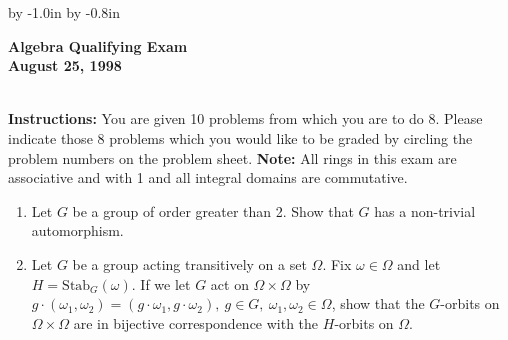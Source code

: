 \def\hcorrection#1{\advance\hoffset by #1 }
\def\vcorrection#1{\advance\voffset by #1 }

\pagestyle{plain}


\vcorrection{-1.0in}
\hcorrection{-0.8in}
\textwidth 6.0in
\textheight 9.0in

\begin{Large}


\def\Q{{\Bbb Q}}
\def\F{{\Bbb F}}
\def\K{{\Bbb K}}



\begin{center}\begin{LARGE}
{\bf  Algebra Qualifying Exam}\\ 
{\bf August {\bf 25}, 1998}\\ \end{LARGE}
\end{center}
\vspace{0.1in}
\noindent\hrulefill\\
{\bf Instructions:} You are given 10 problems from which you are to do 8.
 Please indicate those  8 problems which you would like  to be graded 
by circling the problem numbers on the  problem sheet. 
{\bf Note:} All rings in this exam are associative and with 1 and 
all integral domains are commutative.


\vspace{0.2in}

\begin{enumerate}

\item Let $G$ be a group of order greater than 2. Show that $G$ has a
non-trivial automorphism.

\item Let $G$ be a group acting transitively on a set $\Omega $. Fix
$\omega\in \Omega$ and let $H=\mbox{Stab}_G(\omega )$. If we let $G$
act on $\Omega\times\Omega $ by $g\cdot (\omega_1,\omega_2) =(g\cdot\omega_1,
g\cdot\omega_2),\ g\in G,\ \omega_1,\omega_2\in\Omega $, 
show that the $G$-orbits on $\Omega\times\Omega $ are in
bijective correspondence with the $H$-orbits on $\Omega $.


\end{enumerate}
\end{Large}
